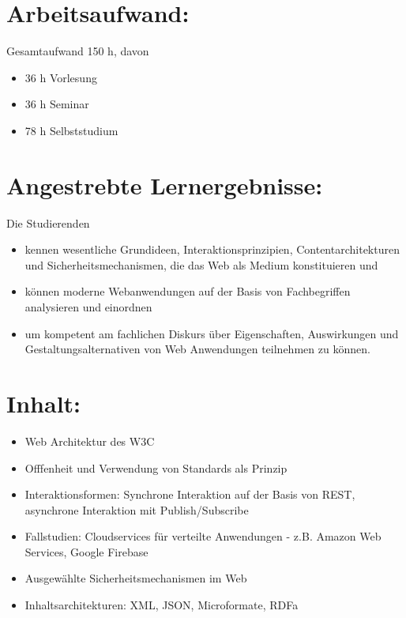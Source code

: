 \section*{Arbeitsaufwand:}\label{arbeitsaufwand-11}

Gesamtaufwand 150 h, davon

\begin{itemize}
\tightlist
\item
  36 h Vorlesung
\item
  36 h Seminar
\item
  78 h Selbststudium
\end{itemize}

\section*{Angestrebte
Lernergebnisse:}\label{angestrebte-lernergebnisse-11}

Die Studierenden

\begin{itemize}
\tightlist
\item
  kennen wesentliche Grundideen, Interaktionsprinzipien,
  Contentarchitekturen und Sicherheitsmechanismen, die das Web als
  Medium konstituieren und
\item
  können moderne Webanwendungen auf der Basis von Fachbegriffen
  analysieren und einordnen
\item
  um kompetent am fachlichen Diskurs über Eigenschaften, Auswirkungen
  und Gestaltungsalternativen von Web Anwendungen teilnehmen zu können.
\end{itemize}

\section*{Inhalt:}\label{inhalt-11}

\begin{itemize}
\tightlist
\item
  Web Architektur des W3C
\item
  Offfenheit und Verwendung von Standards als Prinzip
\item
  Interaktionsformen: Synchrone Interaktion auf der Basis von REST,
  asynchrone Interaktion mit Publish/Subscribe
\item
  Fallstudien: Cloudservices für verteilte Anwendungen - z.B. Amazon Web
  Services, Google Firebase
\item
  Ausgewählte Sicherheitsmechanismen im Web
\item
  Inhaltsarchitekturen: XML, JSON, Microformate, RDFa
\end{itemize}


